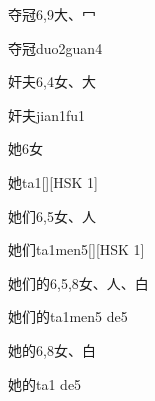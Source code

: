 \begin{entry}{夺冠}{6,9}{⼤、⼍}
  \begin{phonetics}{夺冠}{duo2guan4}
  \end{phonetics}
\end{entry}

\begin{entry}{奸夫}{6,4}{⼥、⼤}
  \begin{phonetics}{奸夫}{jian1fu1}
  \end{phonetics}
\end{entry}

\begin{entry}{她}{6}{⼥}
  \begin{phonetics}{她}{ta1}[][HSK 1]
  \end{phonetics}
\end{entry}

\begin{entry}{她们}{6,5}{⼥、⼈}
  \begin{phonetics}{她们}{ta1men5}[][HSK 1]
  \end{phonetics}
\end{entry}

\begin{entry}{她们的}{6,5,8}{⼥、⼈、⽩}
  \begin{phonetics}{她们的}{ta1men5 de5}
  \end{phonetics}
\end{entry}

\begin{entry}{她的}{6,8}{⼥、⽩}
  \begin{phonetics}{她的}{ta1 de5}
  \end{phonetics}
\end{entry}

